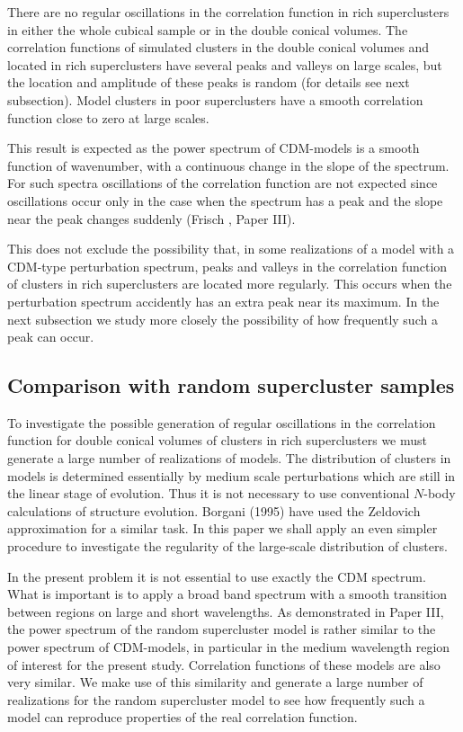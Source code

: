 There are no regular oscillations in the correlation function in rich
superclusters in either the whole cubical sample or in the double conical
volumes.  The correlation functions of simulated clusters in the double
conical volumes and located in rich superclusters have several peaks and
valleys on large scales, but the location and amplitude of these peaks is
random (for details see next subsection). Model clusters in poor
superclusters have a smooth correlation function close to zero at large
scales.

This result is expected as the power spectrum of CDM-models is a smooth
function of wavenumber, with a continuous change in the slope of the
spectrum. For such spectra  oscillations of the correlation function
are not expected since oscillations occur only in the case when the
spectrum has a peak and the slope near the peak changes suddenly
(Frisch , Paper III).

This does not exclude the possibility that, in some realizations of a
model with a CDM-type perturbation spectrum, peaks and valleys in the
correlation function of clusters in rich superclusters are located
more regularly. This occurs when the perturbation spectrum accidently
has an extra peak near its maximum.  In the next subsection we study 
more closely the possibility of how frequently such a peak can occur.

\subsection{ Comparison with random supercluster samples}

To investigate the possible generation of regular oscillations in the
correlation function for double conical volumes of clusters in
rich superclusters we must generate a large number of
realizations of  models.  The distribution of clusters in models is
determined essentially by  medium scale perturbations which are still
in the linear stage of evolution. Thus it is not necessary to use
conventional $N$-body calculations of structure evolution. Borgani
\etal (1995) have used the Zeldovich approximation for a similar task.
In this paper we shall apply an even simpler procedure to investigate the
regularity of the large-scale distribution of clusters.

In the present problem it is not essential to use exactly the CDM
spectrum.  What is important is to apply a broad band spectrum with a
smooth transition between regions on large and short wavelengths.  As
demonstrated in Paper III, the power spectrum of the random
supercluster model is rather similar to the power spectrum of
CDM-models, in particular in the medium wavelength region of interest
for the present study. Correlation functions of these models are also
very similar.  We make use of this similarity and generate a large
number of realizations for the random supercluster model to see how
frequently such a model can reproduce properties of the real
correlation function.

